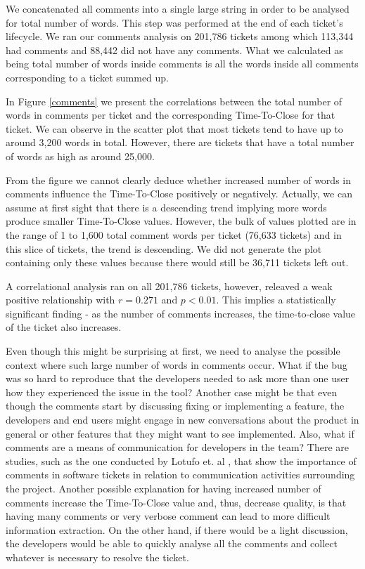 \documentclass{mpaper}
\begin{document}
We concatenated all comments into a single large string in order to be analysed for total number of words. This step 
was performed at the end of each ticket's lifecycle. We ran our comments analysis on 201,786 tickets among which 
113,344 had comments and 88,442 did not have any comments. What we calculated as being total number of words inside comments 
is all the words inside all comments corresponding to a ticket summed up.

In Figure \ref{comments} we present the correlations between the total number of words in comments per ticket and 
the corresponding Time-To-Close for that ticket. We can observe in the scatter plot that most tickets tend to 
have up to around 3,200 words in total. However, there are tickets that have a total number of words as high as 
around 25,000. 

From the figure we cannot clearly deduce whether increased number of words in comments influence 
the Time-To-Close positively or negatively. Actually, we can assume at first sight that there is a descending trend implying more 
words produce smaller Time-To-Close values. However, the bulk of values plotted are in the range of 
1 to 1,600 total comment words per ticket (76,633 tickets) and in this slice of tickets, the trend is descending.
We did not generate the plot containing only these values because there would still be 36,711 tickets left out.

A correlational analysis ran on all 201,786 tickets, however, releaved a weak positive relationship with $r = 0.271$ and $p < 0.01$. 
This implies a statistically significant finding - as the number of comments increases, the time-to-close value of the ticket also increases. 

Even though this might be surprising at first, we need to analyse the possible context where such large 
number of words in comments occur. What if the bug was so hard to reproduce that the developers needed to 
ask more than one user how they experienced the issue in the tool? Another case might be that even though 
the comments start by discussing fixing or implementing a feature, the developers and end users might 
engage in new conversations about the product in general or other features that they might want to see 
implemented. Also, what if comments are a means of communication for developers in the team? There are studies, 
such as the one conducted by Lotufo et. al \cite{lotufo2015modelling}, that show the importance of comments 
in software tickets in relation to communication activities surrounding the project. Another possible explanation 
for having increased number of comments increase the Time-To-Close value and, thus, decrease quality, is that 
having many comments or very verbose comment can lead to more difficult information extraction. On the other 
hand, if there would be a light discussion, the developers would be able to quickly analyse all the comments 
and collect whatever is necessary to resolve the ticket.
\end{document}
